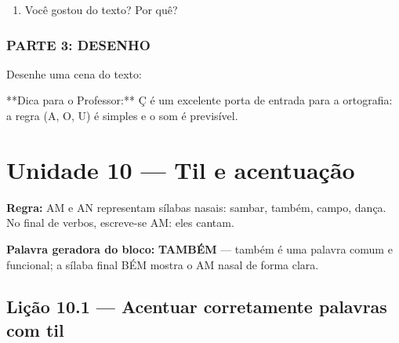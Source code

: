 \begin{exercicio}
\begin{enumerate}
  \item Você gostou do texto? Por quê?
  \begin{center}
  \underline{\hspace{12cm}}
  \end{center}

\end{enumerate}

\subsection*{PARTE 3: DESENHO}

Desenhe uma cena do texto:

\begin{center}
\end{center}

\end{exercicio}

\begin{dica}
**Dica para o Professor:** Ç é um excelente porta de entrada para a ortografia: a regra (A, O, U) é simples e o som é previsível.
\end{dica}



\chapter{Unidade 10 --- Til e acentuação}


\textbf{Regra:} AM e AN representam sílabas nasais: sambar, também, campo, dança. No final de verbos, escreve-se AM: eles cantam.

\textbf{Palavra geradora do bloco:} \textbf{TAMBÉM} --- também é uma palavra comum e funcional; a sílaba final BÉM mostra o AM nasal de forma clara.

\section{Lição 10.1 --- Acentuar corretamente palavras com til}

